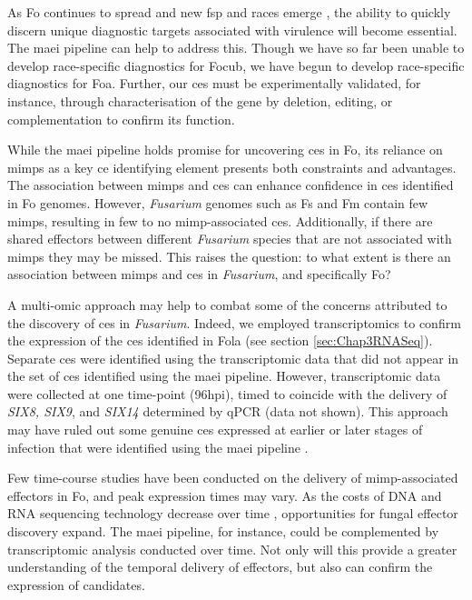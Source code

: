 As \ac{Fo} continues to spread and new \ac{fsp} and races emerge \parencite{Edel-Hermann2019, Henry2020, Mestdagh2023}, the ability to quickly discern unique diagnostic targets associated with virulence will become essential. The \ac{maei} pipeline can help to address this. Though we have so far been unable to develop race-specific diagnostics for \ac{Focub}, we have begun to develop race-specific diagnostics for \acf{Foa}. Further, our \acfp{ce} must be experimentally validated, for instance, through characterisation of the gene by deletion, editing, or complementation to confirm its function. 

While the \ac{maei} pipeline holds promise for uncovering \acp{ce} in \ac{Fo}, its reliance on \acp{mimp} as a key \ac{ce} identifying element presents both constraints and advantages. The association between \acp{mimp} and \acp{ce} can enhance confidence in \acp{ce} identified in \ac{Fo} genomes. However, \textit{Fusarium} genomes such as \acl{Fs} and \acl{Fm} contain few \acp{mimp}, resulting in few to no \ac{mimp}-associated \acp{ce}. Additionally, if there are shared effectors between different \textit{Fusarium} species that are not associated with \acp{mimp} they may be missed. This raises the question: to what extent is there an association between \acp{mimp} and \acp{ce} in \textit{Fusarium}, and specifically \ac{Fo}? 

A multi-omic approach may help to combat some of the concerns attributed to the discovery of \acp{ce} in \textit{Fusarium}. Indeed, we employed transcriptomics to confirm the expression of the \acp{ce} identified in \ac{Fola} (see section \ref{sec:Chap3RNASeq}). Separate \acp{ce} were identified using the transcriptomic data that did not appear in the set of \acp{ce} identified using the \ac{maei} pipeline. However, transcriptomic data were collected at one time-point (96\ac{hpi}), timed to coincide with the delivery of \textit{SIX8, SIX9}, and \textit{SIX14} determined by qPCR (data not shown). This approach may have ruled out some genuine \acp{ce} expressed at earlier or later stages of infection that were identified using the  \ac{maei} pipeline \parencite{Toruno2016}. 

Few time-course studies have been conducted on the delivery of \ac{mimp}-associated effectors in \ac{Fo}, and peak expression times may vary. As the costs of DNA and RNA sequencing technology decrease over time \parencite{Chan2005, Hu2021}, opportunities for fungal effector discovery expand. The \ac{maei} pipeline, for instance, could be complemented by transcriptomic analysis conducted over time. Not only will this provide a greater understanding of the temporal delivery of effectors, but also can confirm the expression of candidates.

